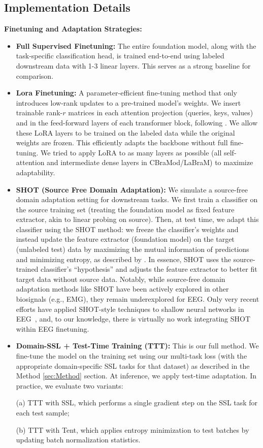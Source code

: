 \subsection{Implementation Details}
\label{sec:Appendix_Hyperparameters}

\textbf{Finetuning and Adaptation Strategies:} 

\begin{itemize}
    \item \textbf{Full Supervised Finetuning:} The entire foundation model, along with the task-specific classification head, is trained end-to-end using labeled downstream data with 1-3 linear layers. This serves as a strong baseline for comparison.
    \item \textbf{Lora Finetuning:} A parameter-efficient fine-tuning method that only introduces low-rank updates to a pre-trained model’s weights. We insert trainable rank-$r$ matrices in each attention projection (queries, keys, values) and in the feed-forward layers of each transformer block, following \cite{hu2022lora}. We allow these LoRA layers to be trained on the labeled data while the original weights are frozen. This efficiently adapts the backbone without full fine-tuning. We tried to apply LoRA to as many layers as possible (all self-attention and intermediate dense layers in CBraMod/LaBraM) to maximize adaptability.
    \item \textbf{SHOT (Source Free Domain Adaptation):} We simulate a source-free domain adaptation setting for downstream tasks. We first train a classifier on the source training set (treating the foundation model as fixed feature extractor, akin to linear probing on source). Then, at test time, we adapt this classifier using the SHOT method: we freeze the classifier’s weights and instead update the feature extractor (foundation model) on the target (unlabeled test) data by maximizing the mutual information of predictions and minimizing entropy, as described by \cite{liang2020we}. In essence, SHOT uses the source-trained classifier’s “hypothesis” and adjusts the feature extractor to better fit target data without source data. Notably, while source-free domain adaptation methods like SHOT have been actively explored in other biosignals (e.g., EMG), they remain underexplored for EEG. Only very recent efforts have applied SHOT-style techniques to shallow neural networks in EEG~\citep{wang2024lightweight,li2024spdim}, and, to our knowledge, there is virtually no work integrating SHOT within EEG finetuning.
    \item \textbf{Domain-SSL + Test-Time Training (TTT):} This is our full method. We fine-tune the model on the training set using our multi-task loss (with the appropriate domain-specific SSL tasks for that dataset) as described in the Method \ref{sec:Method} section. At inference, we apply test-time adaptation. In practice, we evaluate two variants: 

    (a) TTT with SSL, which performs a single gradient step on the SSL task for each test sample; 

    (b) TTT with Tent, which applies entropy minimization to test batches by updating batch normalization statistics.
\end{itemize}

